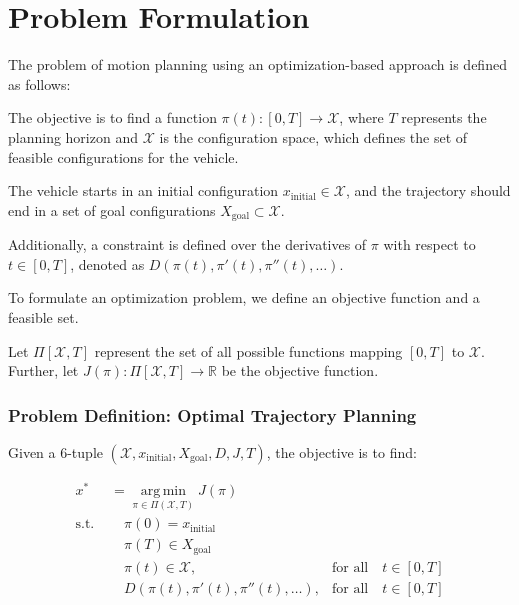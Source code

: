 \section{Problem Formulation} \label{sec:problem_formulation}

The problem of motion planning using an optimization-based approach is defined as follows:

The objective is to find a function
$\pi(t): [0,T] \to \mathcal{X}$, where $T$ represents the planning horizon and $\mathcal{X}$ is the configuration space, which defines the set of
feasible configurations for the vehicle.

The vehicle starts in an initial configuration $x_{\text{initial}} \in \mathcal{X}$, and the trajectory should end in a set of goal configurations
$X_{\text{goal}} \subset \mathcal{X}$.

Additionally, a constraint is defined over the derivatives of $\pi$ with respect to $t \in [0, T]$, denoted as $D(\pi(t), \pi'(t), \pi''(t), \dots)$.

To formulate an optimization problem, we define an objective function and a feasible set.

Let $\Pi[\mathcal{X}, T]$ represent the set of all possible functions mapping $[0, T]$ to $\mathcal{X}$.
Further, let $J(\pi): \Pi[\mathcal{X}, T] \to \mathbb{R}$ be the objective function.

\subsubsection{Problem Definition: Optimal Trajectory Planning}

Given a 6-tuple $(\mathcal{X}, x_{\text{initial}}, X_{\text{goal}}, D, J, T)$, the objective is to find:

\begin{align}
	x^* & = \underset{\pi \in \Pi(\mathcal{X},T)}{\operatorname{arg\,min}}
	J(\pi)                                                                                                                        \\ \text{s.t.
	}   & \quad \pi(0) = x_{\text{initial}}                                                                                       \\
	    & \quad \pi(T) \in X_{\text{goal}}                                                                                        \\
	    & \quad \pi(t) \in \mathcal{X},                                    & \text{for all} \quad t \in [0,T]                     \\
	    & \quad D(\pi(t), \pi'(t), \pi''(t), \dots),                       & \text{for all} \quad t \in [0,T] \label{eq:dynamics}
\end{align}